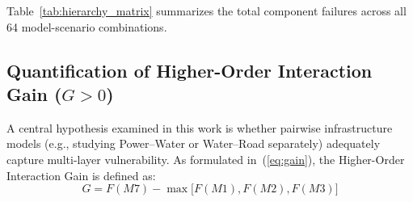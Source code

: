 Table~\ref{tab:hierarchy_matrix} summarizes the total component failures across all 64 model-scenario combinations.

\begin{table}[!t]
\renewcommand{\arraystretch}{1.2}
\setlength{\tabcolsep}{2.2pt}
\caption{System-Wide Component Failures Across Coupling Hierarchy ($M0$--$M7$) and Scenarios ($S1$--$S8$)}
\label{tab:hierarchy_matrix}
\centering
{}
\end{table}

\subsection{Quantification of Higher-Order Interaction Gain ($G > 0$)}

A central hypothesis examined in this work is whether pairwise infrastructure models (e.g., studying Power--Water or Water--Road separately) adequately capture multi-layer vulnerability. As formulated in~(\ref{eq:gain}), the Higher-Order Interaction Gain is defined as:
\begin{equation}
G = F(M7) - \max\big[F(M1), F(M2), F(M3)\big]
\label{eq:gain_empirical}
\end{equation}

